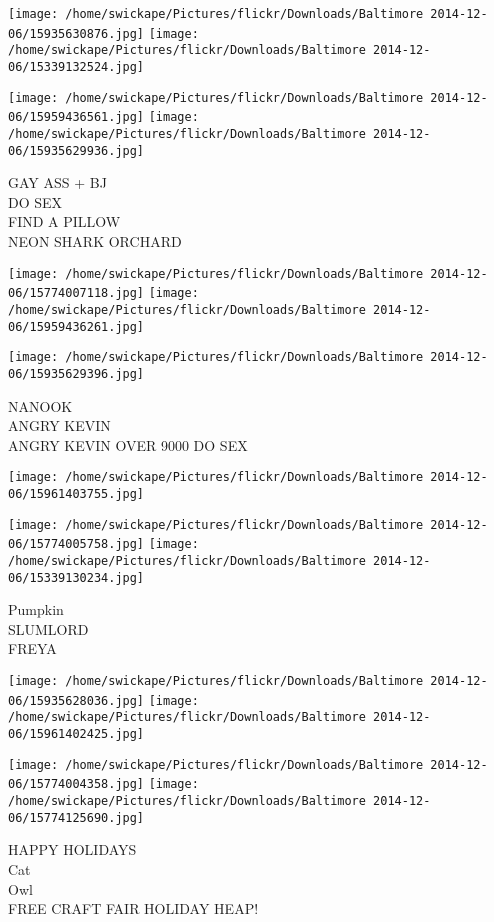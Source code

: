 \documentclass[10pt,letterpaper]{article}
\begin{document}
\texttt{[image: /home/swickape/Pictures/flickr/Downloads/Baltimore 2014-12-06/15935630876.jpg]}
\texttt{[image: /home/swickape/Pictures/flickr/Downloads/Baltimore 2014-12-06/15339132524.jpg]}

\texttt{[image: /home/swickape/Pictures/flickr/Downloads/Baltimore 2014-12-06/15959436561.jpg]}
\texttt{[image: /home/swickape/Pictures/flickr/Downloads/Baltimore 2014-12-06/15935629936.jpg]}

GAY ASS + BJ\\
DO SEX\\
FIND A PILLOW\\
NEON SHARK ORCHARD
\pagebreak

\texttt{[image: /home/swickape/Pictures/flickr/Downloads/Baltimore 2014-12-06/15774007118.jpg]}
\texttt{[image: /home/swickape/Pictures/flickr/Downloads/Baltimore 2014-12-06/15959436261.jpg]}

\texttt{[image: /home/swickape/Pictures/flickr/Downloads/Baltimore 2014-12-06/15935629396.jpg]}

NANOOK\\
ANGRY KEVIN\\
ANGRY KEVIN OVER 9000 DO SEX
\pagebreak

\texttt{[image: /home/swickape/Pictures/flickr/Downloads/Baltimore 2014-12-06/15961403755.jpg]}

\vspace{0.25in}
\texttt{[image: /home/swickape/Pictures/flickr/Downloads/Baltimore 2014-12-06/15774005758.jpg]}
\texttt{[image: /home/swickape/Pictures/flickr/Downloads/Baltimore 2014-12-06/15339130234.jpg]}

Pumpkin\\
SLUMLORD\\
FREYA
\pagebreak

\texttt{[image: /home/swickape/Pictures/flickr/Downloads/Baltimore 2014-12-06/15935628036.jpg]}
\texttt{[image: /home/swickape/Pictures/flickr/Downloads/Baltimore 2014-12-06/15961402425.jpg]}

\texttt{[image: /home/swickape/Pictures/flickr/Downloads/Baltimore 2014-12-06/15774004358.jpg]}
\texttt{[image: /home/swickape/Pictures/flickr/Downloads/Baltimore 2014-12-06/15774125690.jpg]}

HAPPY HOLIDAYS\\
Cat\\
Owl\\
FREE CRAFT FAIR HOLIDAY HEAP!
\pagebreak
\end{document}
